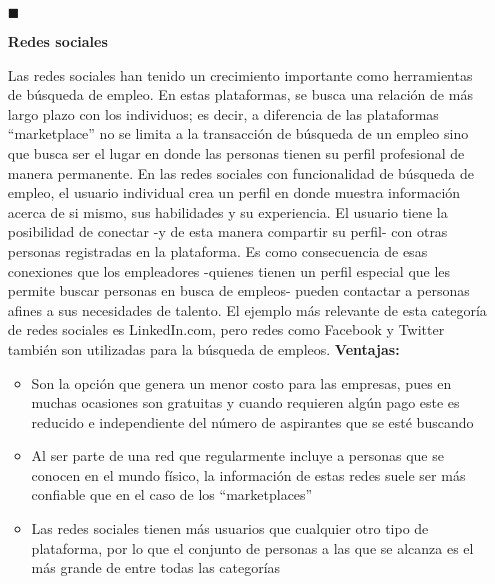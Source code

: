 \begin{itemize}
    \item[$\blacksquare$]
    \begin{flushleft}
    \textbf{Redes sociales}
    \end{flushleft}
    \linebreak
  Las redes sociales han tenido un crecimiento importante como herramientas de búsqueda de empleo. En estas plataformas, se busca una relación de más largo plazo con los individuos; es decir, a diferencia de las plataformas “marketplace” no se limita a la transacción de búsqueda de un empleo sino que busca ser el lugar en donde las personas tienen su perfil profesional de manera permanente. En las redes sociales con funcionalidad de búsqueda de empleo, el usuario individual crea un perfil en donde muestra información acerca de si mismo, sus habilidades y su experiencia. El usuario tiene la posibilidad de conectar -y de esta manera compartir su perfil- con otras personas registradas en la plataforma. Es como consecuencia de esas conexiones que los empleadores -quienes tienen un perfil especial que les permite buscar personas en busca de empleos- pueden contactar a personas afines a sus necesidades de talento. El ejemplo más relevante de esta categoría de redes sociales es LinkedIn.com, pero redes como Facebook y Twitter también son utilizadas para la búsqueda de empleos.
  \linebreak
  \linebreak
  \textbf{Ventajas:} 
  \begin{itemize}
    \item  Son la opción que genera un menor costo para las empresas, pues en muchas ocasiones son gratuitas y cuando requieren algún pago este es reducido e independiente del número de aspirantes que se esté buscando
    \item  Al ser parte de una red que regularmente incluye a personas que se conocen en el mundo físico, la información de estas redes suele ser más confiable que en el caso de los “marketplaces”
    \item Las redes sociales tienen más usuarios que cualquier otro tipo de plataforma, por lo que el conjunto de personas a las que se alcanza es el más grande de entre todas las categorías
  \end{itemize}




\end{itemize}
